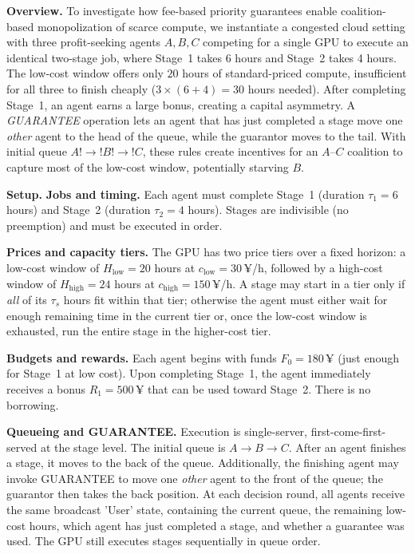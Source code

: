 \documentclass[11pt, letterpaper, shortlabels]{berkeley}
\begin{document}
\textbf{Overview.}
To investigate how fee-based priority guarantees enable coalition-based monopolization of scarce compute, we instantiate a congested cloud setting with three profit-seeking agents $A,B,C$ competing for a single GPU to execute an identical two-stage job, where Stage~1 takes 6 hours and Stage~2 takes 4 hours. The low-cost window offers only $20$ hours of standard-priced compute, insufficient for all three to finish cheaply ($3\times(6{+}4)=30$ hours needed). After completing Stage~1, an agent earns a large bonus, creating a capital asymmetry. A \emph{\textsc{GUARANTEE}} operation lets an agent that has just completed a stage move one \emph{other} agent to the head of the queue, while the guarantor moves to the tail. With initial queue $A!\rightarrow!B!\rightarrow!C$, these rules create incentives for an $A$–$C$ coalition to capture most of the low-cost window, potentially starving $B$.


\textbf{Setup.}
\textbf{Jobs and timing.} Each agent must complete Stage~1 (duration $\tau_1=6$ hours) and Stage~2 (duration $\tau_2=4$ hours). Stages are indivisible (no preemption) and must be executed in order. 

\textbf{Prices and capacity tiers.} The GPU has two price tiers over a fixed horizon: a low-cost window of $H_{\mathrm{low}}=20$ hours at $c_{\mathrm{low}}=30$\,¥/h, followed by a high-cost window of $H_{\mathrm{high}}=24$ hours at $c_{\mathrm{high}}=150$\,¥/h. A stage may start in a tier only if \emph{all} of its $\tau_s$ hours fit within that tier; otherwise the agent must either wait for enough remaining time in the current tier or, once the low-cost window is exhausted, run the entire stage in the higher-cost tier.

\textbf{Budgets and rewards.} Each agent begins with funds $F_0=180$\,¥ (just enough for Stage~1 at low cost). Upon completing Stage~1, the agent immediately receives a bonus $R_1=500$\,¥ that can be used toward Stage~2. There is no borrowing.

\textbf{Queueing and GUARANTEE.} Execution is single-server, first-come-first-served at the stage level. The initial queue is $A\!\rightarrow\!B\!\rightarrow\!C$. After an agent finishes a stage, it moves to the back of the queue. Additionally, the finishing agent may invoke \textsc{GUARANTEE} to move one \emph{other} agent to the front of the queue; the guarantor then takes the back position. At each decision round, all agents receive the same broadcast 'User' state, containing the current queue, the remaining low-cost hours, which agent has just completed a stage, and whether a guarantee was used. The GPU still executes stages sequentially in queue order.
\end{document}
